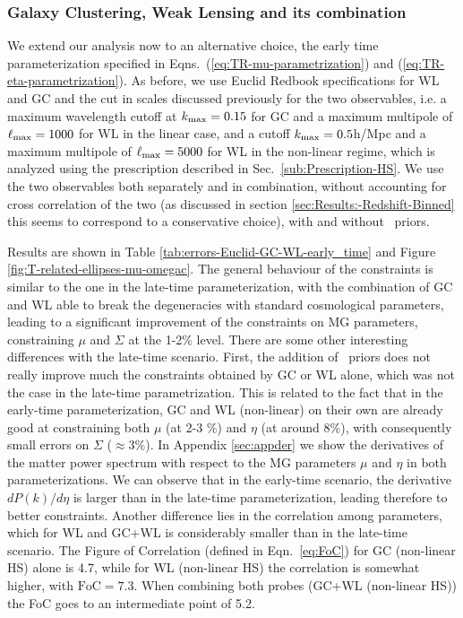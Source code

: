 \subsubsection{Galaxy Clustering, Weak Lensing and its combination}

We extend our analysis now to an alternative choice, the early time parameterization specified in Eqns.\ (\ref{eq:TR-mu-parametrization}) and (\ref{eq:TR-eta-parametrization}). As before, we use
Euclid Redbook specifications for WL and GC
and the cut in scales discussed previously for the two observables, i.e. 
a maximum wavelength cutoff at $k_{\rm max}=0.15$ for GC and a maximum multipole of $\ell_{\rm max}=1000$ for WL in the 
linear case, and a cutoff $k_{\rm max}=0.5$h/Mpc and a maximum multipole of $\ell_{\rm max}=5000$ for WL in the non-linear regime,
which is analyzed using the prescription described in Sec.\ \ref{sub:Prescription-HS}.
We use the two observables both separately and in combination, without accounting for cross correlation of the two (as discussed in section \ref{sec:Results:-Redshift-Binned} this seems to correspond to a conservative choice), 
with and without \planck\ priors.

Results are shown in Table \ref{tab:errors-Euclid-GC-WL-early_time} and 
Figure \ref{fig:T-related-ellipses-mu-omegac}.
The general behaviour of the constraints is similar to the one in the late-time parameterization,
with the combination of GC and WL able to break the degeneracies with standard cosmological
parameters, leading to a significant improvement of the constraints on MG parameters, constraining $\mu$ and $\Sigma$ at the 1-2\% level. 
There are some other interesting differences with the late-time scenario. 
First, the addition of \planck\ priors does not really improve much the constraints obtained by GC or WL alone, which was not the case in the 
late-time parametrization. This is related to the fact that in the early-time parameterization, GC and WL (non-linear) on their own are already good at constraining both
$\mu$ (at 2-3 \%) and $\eta$ (at around 8\%), with consequently small errors on $\Sigma$ ($\approx 3$\%).
In Appendix \ref{sec:appder} we show the derivatives of the matter power spectrum with respect to the MG parameters $\mu$ and $\eta$ in both
parameterizations. We can observe that in the early-time scenario, the derivative  $dP(k)/d\eta$ is larger than in the late-time
parameterization, leading therefore to better constraints.
Another difference lies in the correlation among parameters, which for WL and GC+WL is considerably smaller than in the late-time scenario. 
The Figure of Correlation (defined in Eqn.\ \ref{eq:FoC}) for GC (non-linear HS) alone is 4.7, while
for WL (non-linear HS) the correlation is somewhat higher, with $\textrm{FoC}=7.3$.
When combining both probes (GC+WL (non-linear HS)) the FoC goes to an intermediate point of 5.2.

